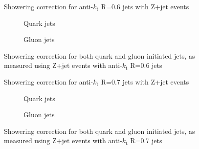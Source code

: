 \clearpage
\begin{figure}[!ht]
 \centering
 \caption[Showering correction for anti-$k_{\mathrm t}$ R=0.6 jets with Z+jet events]
 {\small Showering correction for anti-$k_{\mathrm t}$ R=0.6 jets with Z+jet events}
 \label{plot:ZJetShowering6App}
\end{figure}

\begin{figure}[!ht]
 \centering
 \begin{subfigure}{.5\textwidth}
  \centering
  \caption{Quark jets}
 \end{subfigure}%
 \begin{subfigure}{.5\textwidth}
  \centering
  \caption{Gluon jets}
 \end{subfigure}
 \caption[Quark/gluon jet showering correction, anti-$k_{\mathrm t}$ R=0.6, Z+jet]
 {\small Showering correction for both quark and gluon initiated jets, as measured using Z+jet events with anti-$k_{\mathrm t}$ R=0.6 jets}
 \label{plot:ZJetShoweringFlav6App}
\end{figure}

\clearpage
\begin{figure}[!ht]
 \centering
 \caption[Showering correction for anti-$k_{\mathrm t}$ R=0.7 jets with Z+jet events]
 {\small Showering correction for anti-$k_{\mathrm t}$ R=0.7 jets with Z+jet events}
 \label{plot:ZJetShowering7App}
\end{figure}

\begin{figure}[!ht]
 \centering
 \begin{subfigure}{.5\textwidth}
  \centering
  \caption{Quark jets}
 \end{subfigure}%
 \begin{subfigure}{.5\textwidth}
  \centering
  \caption{Gluon jets}
 \end{subfigure}
 \caption[Quark/gluon jet showering correction, anti-$k_{\mathrm t}$ R=0.7, Z+jet]
 {\small Showering correction for both quark and gluon initiated jets, as measured using Z+jet events with anti-$k_{\mathrm t}$ R=0.7 jets}
 \label{plot:ZJetShoweringFlav7App}
\end{figure}

